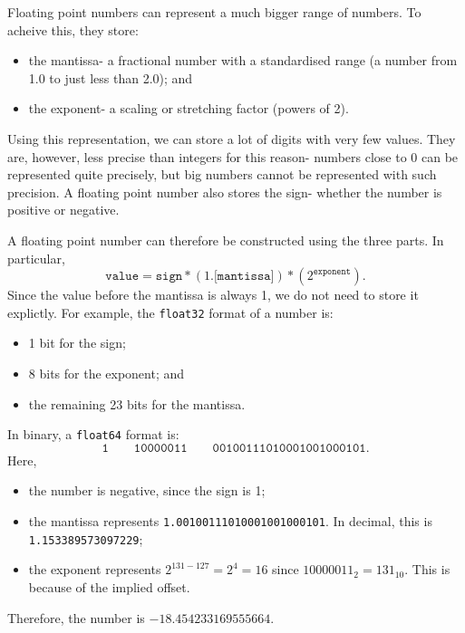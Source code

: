 \documentclass[a4paper, openany]{memoir}
\begin{document}
    Floating point numbers can represent a much bigger range of numbers. To acheive this, they store:
    \begin{itemize}
        \item the mantissa- a fractional number with a standardised range (a number from 1.0 to just less than 2.0); and
        \item the exponent- a scaling or stretching factor (powers of 2).
    \end{itemize}
    Using this representation, we can store a lot of digits with very few values. They are, however, less precise than integers for this reason- numbers close to 0 can be represented quite precisely, but big numbers cannot be represented with such precision. A floating point number also stores the sign- whether the number is positive or negative.

    A floating point number can therefore be constructed using the three parts. In particular,
    \[\texttt{value} = \texttt{sign} * (1.\texttt{[mantissa]}) * (2^{\texttt{exponent}}).\]
    Since the value before the mantissa is always 1, we do not need to store it explictly. For example, the \texttt{float32} format of a number is:
    \begin{itemize}
        \item 1 bit for the sign;
        \item 8 bits for the exponent; and
        \item the remaining 23 bits for the mantissa.
    \end{itemize}
    In binary, a \texttt{float64} format is:
    \[\texttt{1} \qquad \texttt{10000011} \qquad \texttt{00100111010001001000101}.\]
    Here,
    \begin{itemize}
        \item the number is negative, since the sign is 1;
        \item the mantissa represents \texttt{1.00100111010001001000101}. In decimal, this is \texttt{1.153389573097229};
        \item the exponent represents $2^{131 - 127} = 2^4 = 16$ since $10000011_2 = 131_{10}$. This is because of the implied offset.
    \end{itemize}
    Therefore, the number is $-18.454233169555664$.
\end{document}
